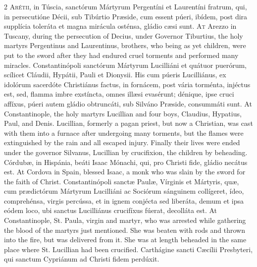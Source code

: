 \begin{paracol}{2}
\lettrine[lines=2]{A}{rétii,} in Túscia, 
 sanctórum Mártyrum Pergentíni et Laurentíni fratrum, qui, in persecutióne 
 Décii, sub Tibúrtio Præside, cum essent púeri, ibídem, post dira supplícia 
 toleráta et magna mirácula osténsa, gládio cæsi sunt.
\switchcolumn
{}
\lettrine[lines=2]{A}{t} Arezzo in Tuscany, during the 
 persecution of Decius, under Governor Tiburtius, the holy martyrs 
 Pergentinus and Laurentinus, brothers, who being as yet children, were put 
 to the sword after they had endured cruel torments and performed many 
 miracles.
\switchcolumn*
{}
Constantinópoli 
 sanctórum Mártyrum Lucilliáni et quátuor puerórum, scílicet Cláudii, Hypátii, 
 Pauli et Dionysii. His cum púeris Lucilliánus, ex idolórum sacerdóte 
 Christiánus factus, in fornácem, post vária torménta, injéctus est, sed, 
 flamma imbre exstíncta, omnes illæsi evasérunt; dénique, ipse cruci affíxus, 
 púeri autem gládio obtruncáti, sub Silváno Præside, consummáti sunt.
\switchcolumn
{}
At Constantinople, the holy martyrs 
 Lucillian and four boys, Claudius, Hypatius, Paul, and Denis. 
 Lucillian, formerly a pagan priest, but now a Christian, was cast with them 
 into a furnace after undergoing many torments, but the flames were 
 extinguished by the rain and all escaped injury. Finally their lives 
 were ended under the governor Silvanus, Lucillian by crucifixion, the 
 children by beheading.
\switchcolumn*
{}
Córdubæ, in Hispánia, 
 beáti Isaac Mónachi, qui, pro Christi fide, gládio necátus est.
\switchcolumn
{}
At Cordova in Spain, blessed Isaac, 
 a monk who was slain by the sword for the faith of Christ.
\switchcolumn*
{}
Constantinópoli sanctæ 
 Paulæ, Vírginis et Mártyris, quæ, cum prædictórum Mártyrum Lucilliáni ac 
 Sociórum sánguinem collígeret, ídeo, comprehénsa, virgis percússa, et in 
 ignem conjécta sed liberáta, demum et ipsa eódem loco, ubi sanctus 
 Lucilliánus crucifíxus fúerat, decolláta est.
\switchcolumn
{}
At Constantinople, St. Paula, virgin 
 and martyr, who was arrested while gathering the blood of the martyrs just 
 mentioned. She was beaten with rods and thrown into the fire, but was 
 delivered from it. She was at length beheaded in the same place where 
 St. Lucillian had been crucified.
\switchcolumn*
{}
Carthágine sancti 
 Cæcílii Presbyteri, qui sanctum Cypriánum ad Christi fidem perdúxit.
\switchcolumn

\end{paracol}
